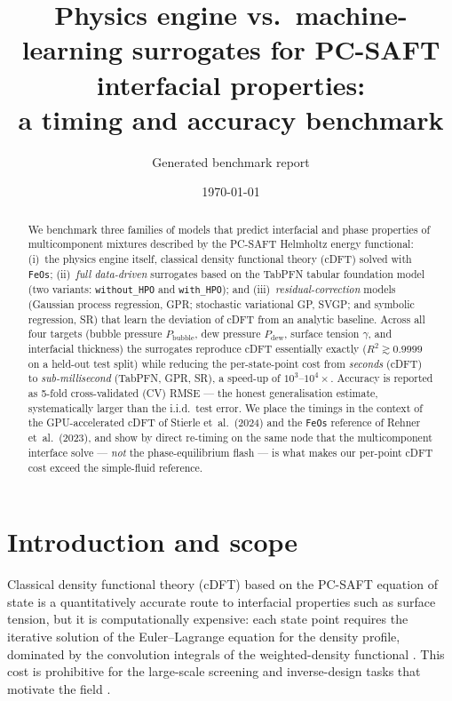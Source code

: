\documentclass[11pt]{article}
\title{\bfseries Physics engine vs.\ machine-learning surrogates for PC-SAFT
interfacial properties:\\ a timing and accuracy benchmark}
\author{Generated benchmark report}
\date{\today}
\begin{document}
\maketitle

\begin{abstract}
We benchmark three families of models that predict interfacial and phase
properties of multicomponent mixtures described by the PC-SAFT Helmholtz energy
functional: (i)~the physics engine itself, classical density functional theory
(cDFT) solved with \texttt{FeOs}; (ii)~\emph{full data-driven} surrogates based
on the TabPFN tabular foundation model (two variants: \texttt{without\_HPO} and
\texttt{with\_HPO}); and (iii)~\emph{residual-correction} models (Gaussian
process regression, GPR; stochastic variational GP, SVGP; and symbolic
regression, SR) that learn the deviation of cDFT from an analytic baseline.
Across all four targets (bubble pressure $P_\mathrm{bubble}$, dew pressure
$P_\mathrm{dew}$, surface tension $\gamma$, and interfacial thickness) the
surrogates reproduce cDFT essentially exactly ($R^2\gtrsim0.9999$ on a held-out
test split) while reducing the per-state-point cost from \emph{seconds} (cDFT)
to \emph{sub-millisecond} (TabPFN, GPR, SR), a speed-up of $10^3$--$10^4\times$.
Accuracy is reported as 5-fold cross-validated (CV) RMSE --- the honest
generalisation estimate, systematically larger than the i.i.d.\ test error. We
place the timings in the context of the GPU-accelerated cDFT of Stierle et~al.\
(2024) and the \texttt{FeOs} reference of Rehner et~al.\ (2023), and show by
direct re-timing on the same node that the multicomponent interface solve ---
\emph{not} the phase-equilibrium flash --- is what makes our per-point cDFT cost
exceed the simple-fluid reference.
\end{abstract}

\section{Introduction and scope}
Classical density functional theory (cDFT) based on the PC-SAFT equation of
state is a quantitatively accurate route to interfacial properties such as
surface tension, but it is computationally expensive: each state point requires
the iterative solution of the Euler--Lagrange equation for the density profile,
dominated by the convolution integrals of the weighted-density functional
\cite{rehner2023feos,stierle2024gpu}. This cost is prohibitive for the
large-scale screening and inverse-design tasks that motivate the field
\cite{stierle2024gpu}.
\end{document}
